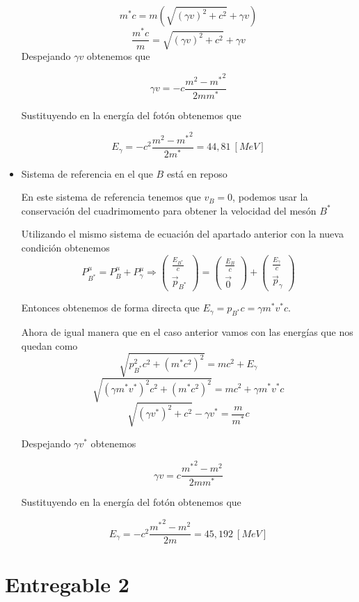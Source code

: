 \documentclass{article}
\begin{document}
\begin{itemize}
\[m^{*}c=m(\sqrt{(\gamma v)^{2}+c^{2}}+\gamma v )\]
\[\frac{m^{*}c}{m}=\sqrt{(\gamma v)^{2}+c^{2}}+\gamma v \]
Despejando $\gamma v$ obtenemos que  

\[\gamma v= -c\frac{m^{2}-{m^{*}}^{2}}{2mm^{*}}\]

Sustituyendo en la energía del fotón obtenemos que 

\[E_{\gamma}= -c^{2}\frac{m^{2}-{m^{*}}^{2}}{2m^{*}}=44,81~\left[ MeV\right]\]


  \item Sistema de referencia en el que $B$ está en reposo
  
  En este sistema de referencia tenemos que $v_{B}=0$, podemos usar la conservación del cuadrimomento para obtener la velocidad del mesón $B^{*}$
  
  Utilizando el mismo sistema de ecuación del apartado anterior con la nueva condición obtenemos 
  \[P^{\mu}_{B^{*}}=P^{\mu}_{B}+P^{\mu}_{\gamma}\Rightarrow \begin{pmatrix}
      \frac{E_{B^{*}}}{c} \\
      \vec{p}_{B^{*}}
  \end{pmatrix}=\begin{pmatrix}
      \frac{E_{B}}{c} \\
      \vec{0}
  \end{pmatrix}+\begin{pmatrix}
    \frac{E_{\gamma}}{c}\\
      \vec{p}_{\gamma}
\end{pmatrix}\]

Entonces obtenemos de forma directa que $E_{\gamma}=p_{B^{*}}c=\gamma m^{*}v^{*}c$. 

Ahora de igual manera que en el caso anterior vamos con las energías que nos quedan como 
\[\sqrt{p_{B^{*}}^{2}c^{2}+(m^{*}c^{2})^{2}}=mc^{2}+ E_{\gamma}\]
\[\sqrt{(\gamma m^{*}v^{*})^{2}c^{2}+(m^{*}c^{2})^{2}}=mc^{2}+ \gamma m^{*}v^{*}c\]
\[\sqrt{(\gamma v^{*})^{2}+c^{2}}-\gamma v^{*}=\frac{m}{m^{*}}c\]

Despejando $\gamma v^{*}$ obtenemos 

\[\gamma v= c\frac{{m^{*}}^{2}-m^{2}}{2mm^{*}}\]

Sustituyendo en la energía del fotón obtenemos que 

\[E_{\gamma}= -c^{2}\frac{{m^{*}}^{2}-m^{2}}{2m}=45,192~\left[ MeV\right]\]

\end{itemize}


\section{Entregable 2}
\end{document}
